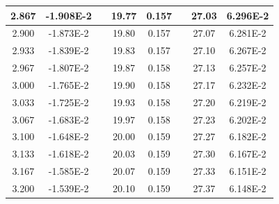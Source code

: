 \documentclass[article,12pt]{elsarticle}
\begin{document}
\begin{longtable}[c]{|c|c|cccccc}
2.867    & -1.908E-2 & \multicolumn{1}{c|}{} & \multicolumn{1}{c|}{19.77}   & \multicolumn{1}{c|}{0.157} & \multicolumn{1}{c|}{} & \multicolumn{1}{c|}{27.03}   & \multicolumn{1}{c|}{6.296E-2} \\ \hline
2.900    & -1.873E-2 & \multicolumn{1}{c|}{} & \multicolumn{1}{c|}{19.80}   & \multicolumn{1}{c|}{0.157} & \multicolumn{1}{c|}{} & \multicolumn{1}{c|}{27.07}   & \multicolumn{1}{c|}{6.281E-2} \\ \hline
2.933    & -1.839E-2 & \multicolumn{1}{c|}{} & \multicolumn{1}{c|}{19.83}   & \multicolumn{1}{c|}{0.157} & \multicolumn{1}{c|}{} & \multicolumn{1}{c|}{27.10}   & \multicolumn{1}{c|}{6.267E-2} \\ \hline
2.967    & -1.807E-2 & \multicolumn{1}{c|}{} & \multicolumn{1}{c|}{19.87}   & \multicolumn{1}{c|}{0.158} & \multicolumn{1}{c|}{} & \multicolumn{1}{c|}{27.13}   & \multicolumn{1}{c|}{6.257E-2} \\ \hline
3.000    & -1.765E-2 & \multicolumn{1}{c|}{} & \multicolumn{1}{c|}{19.90}   & \multicolumn{1}{c|}{0.158} & \multicolumn{1}{c|}{} & \multicolumn{1}{c|}{27.17}   & \multicolumn{1}{c|}{6.232E-2} \\ \hline
3.033    & -1.725E-2 & \multicolumn{1}{c|}{} & \multicolumn{1}{c|}{19.93}   & \multicolumn{1}{c|}{0.158} & \multicolumn{1}{c|}{} & \multicolumn{1}{c|}{27.20}   & \multicolumn{1}{c|}{6.219E-2} \\ \hline
3.067    & -1.683E-2 & \multicolumn{1}{c|}{} & \multicolumn{1}{c|}{19.97}   & \multicolumn{1}{c|}{0.158} & \multicolumn{1}{c|}{} & \multicolumn{1}{c|}{27.23}   & \multicolumn{1}{c|}{6.202E-2} \\ \hline
3.100    & -1.648E-2 & \multicolumn{1}{c|}{} & \multicolumn{1}{c|}{20.00}   & \multicolumn{1}{c|}{0.159} & \multicolumn{1}{c|}{} & \multicolumn{1}{c|}{27.27}   & \multicolumn{1}{c|}{6.182E-2} \\ \hline
3.133    & -1.618E-2 & \multicolumn{1}{c|}{} & \multicolumn{1}{c|}{20.03}   & \multicolumn{1}{c|}{0.159} & \multicolumn{1}{c|}{} & \multicolumn{1}{c|}{27.30}   & \multicolumn{1}{c|}{6.167E-2} \\ \hline
3.167    & -1.585E-2 & \multicolumn{1}{c|}{} & \multicolumn{1}{c|}{20.07}   & \multicolumn{1}{c|}{0.159} & \multicolumn{1}{c|}{} & \multicolumn{1}{c|}{27.33}   & \multicolumn{1}{c|}{6.151E-2} \\ \hline
3.200    & -1.539E-2 & \multicolumn{1}{c|}{} & \multicolumn{1}{c|}{20.10}   & \multicolumn{1}{c|}{0.159} & \multicolumn{1}{c|}{} & \multicolumn{1}{c|}{27.37}   & \multicolumn{1}{c|}{6.148E-2} \\ \hline

\end{longtable}
\end{document}

